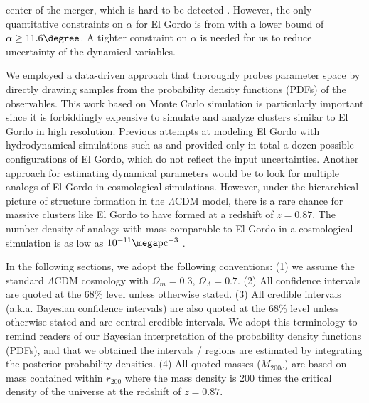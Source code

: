 center of the merger, which is hard to be detected \citep{Vazza11}.
However, the only quantitative constraints on $\alpha$ for El Gordo is from
\cite{L13} with a lower bound of $\alpha \geq 11.6 \degree$. A tighter
constraint on $\alpha$ is needed for us to reduce uncertainty of the
dynamical variables. 
\par 
We employed a data-driven approach that thoroughly probes parameter
space by directly drawing samples from the probability density functions
(PDFs) of
the observables. 
This work based on Monte Carlo simulation is particularly important since
it is forbiddingly expensive to simulate and analyze clusters similar to El
Gordo in high resolution. Previous attempts at modeling El Gordo with hydrodynamical
simulations such as \cite{Donnert13} and \cite{Molnar14} provided only in
total a dozen possible configurations of El Gordo, which do not
reflect the input uncertainties. Another approach for
estimating dynamical parameters would be to look for multiple analogs of El Gordo in cosmological
simulations.  However, under the hierarchical picture
of structure formation in the $\Lambda$CDM model, there is a rare chance
for massive clusters like El Gordo to have formed at a redshift of $z = 0.87$.  
The number density of analogs with mass comparable to El Gordo in a
cosmological simulation is as low as $10^{-11} \mega\text{pc}^{-3}$ .  
\par
In the following sections, we adopt the following conventions: (1) we
assume the standard $\Lambda$CDM cosmology with $\Omega_{m} = 0.3$, $\Omega_{\Lambda} = 0.7$. (2) All confidence intervals are quoted at the 68\% level unless otherwise stated. 
(3) All credible intervals (a.k.a. Bayesian confidence intervals) are also
quoted at the 68\% level unless otherwise stated and are central credible
intervals. We adopt this terminology to remind readers of our Bayesian
interpretation of the probability density functions (PDFs), and that we obtained
the intervals / regions are estimated by integrating the posterior
probability densities.  
(4) All quoted masses ($M_{200c}$) are based on mass contained
within $r_{200}$ where the mass density is 200 times the critical density
of the universe at the redshift of $z = 0.87$. 

